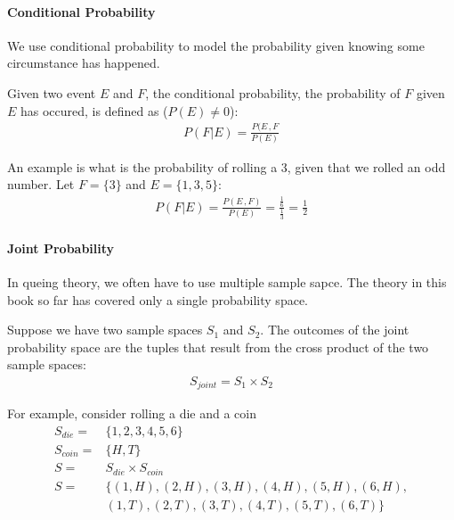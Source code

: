 

\paragraph{Conditional Probability} We use conditional probability to model the
probability given knowing some circumstance has happened.

Given two event $E$ and $F$, the conditional probability, the probability of $F$
given $E$ has occured, is defined as ($P(E) \ne 0$):
\begin{equation*} \begin{split}
	P(F|E) = \frac{P(E\, ,F}{P(E)}
\end{split} \end{equation*}

An example is what is the probability of rolling a 3, given that we rolled an
odd number. Let $F = \{3\}$ and $E = \{1,3,5\}$:
\begin{equation*} \begin{split}
	P(F|E) = \frac{P(E\, , F)}{P(E)} = \frac{\frac{1}{6}}{\frac{1}{3}} =
	\frac{1}{2}
\end{split} \end{equation*}

\paragraph{Joint Probability} In queing theory, we often have to use multiple
sample sapce. The theory in this book so far has covered only a single
probability space.

Suppose we have two sample spaces $S_1$ and $S_2$. The outcomes of the joint
probability space are the tuples that result from the cross product of the two
sample spaces:
\begin{equation*} \begin{split}
	S_{joint} = S_1 \times S_2
\end{split} \end{equation*}

For example, consider rolling a die and a coin
\begin{equation*} \begin{split}
	S_{die} =  & \{1,2,3,4,5,6\} \\
	S_{coin} = & \{H,T\} \\
	S =        & S_{die} \times S_{coin} \\
	S =        & \{(1,H),(2,H),(3,H),(4,H),(5,H),(6,H), \\
	           & (1,T),(2,T),(3,T),(4,T),(5,T),(6,T)\}
\end{split} \end{equation*}

